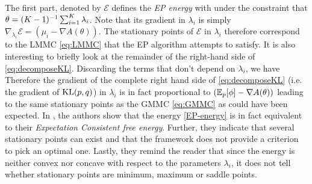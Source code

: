%
%
The first part, denoted by $\mathcal E$ defines the \emph{EP energy} with
%
%
under the constraint that $\theta=(K-1)^{-1} \sum_{i=1}^{K}\lambda_i$. Note that its gradient in $\lambda_i$ is simply $\nabla_{\lambda_i}\mathcal E = (\mu_i-\nabla A(\theta))$. 
The stationary points of $\mathcal E$ in $\lambda_i$ therefore correspond to the LMMC \eqref{eq:LMMC} that the EP algorithm attempts to satisfy.
It is also interesting to briefly look at the remainder of the right-hand side of \eqref{eq:decomposeKL}. Discarding the terms that don't depend on $\lambda_i$, we have
%
%
Therefore the gradient of the complete right hand side of \eqref{eq:decomposeKL} (i.e. the gradient of $\mathrm{KL}\!\left(p,q\right)$) in $\lambda_i$ is in fact proportional to $(\mathbb E_{p}[\phi]-\nabla A(\theta))$ leading to the same stationary points as the GMMC \eqref{eq:GMMC} as could have been expected.
%
In \citet{heskes05}, the authors show that the energy \eqref{EP-energy} is in fact equivalent to their \emph{Expectation Consistent free energy}. Further, they indicate that several stationary points can exist and that the framework does not provide a criterion to pick an optimal one. Lastly, they remind the reader that since the energy is neither convex nor concave with respect to the parameters $\lambda_i$, it does not tell whether stationary points are minimum, maximum or saddle points. 
%
